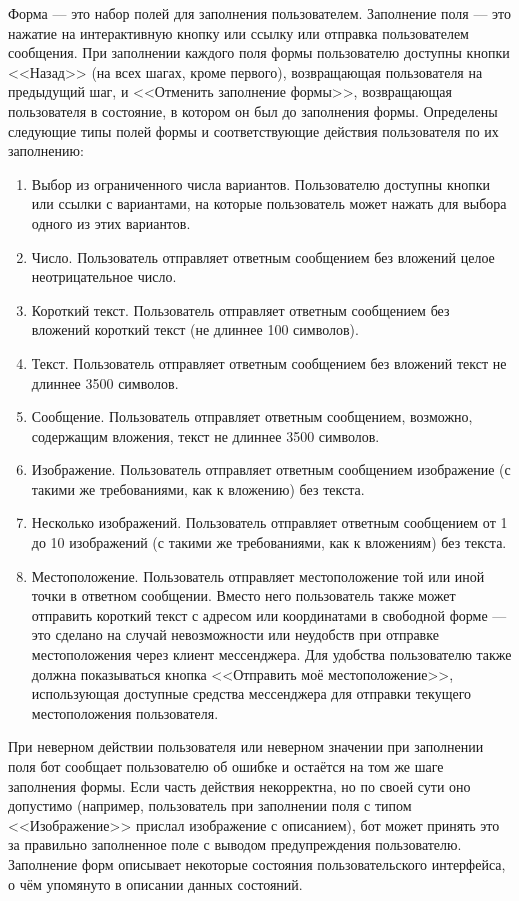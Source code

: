    Форма --- это набор полей для заполнения пользователем.  Заполнение поля --- это нажатие на
    интерактивную кнопку или ссылку или отправка пользователем сообщения. При заполнении
    каждого поля формы пользователю доступны кнопки <<Назад>> (на всех шагах, кроме первого),
    возвращающая пользователя на предыдущий шаг, и <<Отменить заполнение формы>>, возвращающая
    пользователя в состояние, в котором он был до заполнения формы. Определены следующие типы
    полей формы и соответствующие действия пользователя по их заполнению:
    \begin{enumerate}
        \item
            Выбор из ограниченного числа вариантов.
            Пользователю доступны кнопки или ссылки с вариантами, на которые пользователь может нажать
            для выбора одного из этих вариантов.
        \item
            Число.
            Пользователь отправляет ответным сообщением без вложений целое неотрицательное число.
        \item
            Короткий текст.
            Пользователь отправляет ответным сообщением без вложений короткий текст (не длиннее 100 символов).
        \item
            Текст.
            Пользователь отправляет ответным сообщением без вложений текст не длиннее 3500 символов.
        \item
            Сообщение.
            Пользователь отправляет ответным сообщением, возможно, содержащим вложения, текст не длиннее 3500
            символов.
        \item
            Изображение.
            Пользователь отправляет ответным сообщением изображение (с такими же требованиями, как к вложению)
            без текста.
        \item
            Несколько изображений.
            Пользователь отправляет ответным сообщением от 1 до 10 изображений
            (с такими же требованиями, как к вложениям)
            без текста.
        \item
            Местоположение.
            Пользователь отправляет местоположение той или иной точки в ответном сообщении.
            Вместо него пользователь также может отправить короткий текст с адресом или координатами в
            свободной форме --- это сделано на случай невозможности или неудобств при отправке
            местоположения через клиент мессенджера.
            Для удобства пользователю также должна показываться кнопка <<Отправить моё местоположение>>,
            использующая доступные средства мессенджера для отправки текущего местоположения пользователя.
    \end{enumerate}
    При неверном действии пользователя или неверном значении при заполнении поля бот сообщает пользователю
    об ошибке и остаётся на том же шаге заполнения формы. Если часть действия некорректна, но по своей сути
    оно допустимо (например, пользователь при заполнении поля с типом <<Изображение>> прислал изображение с
    описанием), бот может принять это за правильно заполненное поле с выводом предупреждения пользователю.
    Заполнение форм описывает некоторые состояния пользовательского интерфейса, о чём упомянуто в описании
    данных состояний.

